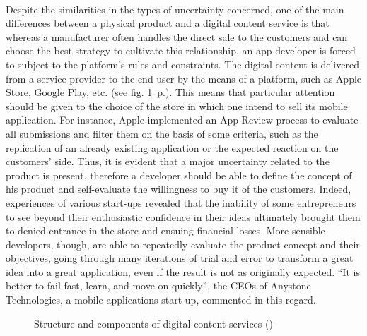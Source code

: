 \documentclass[twoside]{report}
\begin{document}
	\paragraph{}
	Despite the similarities in the types of uncertainty concerned, one of the main differences between a physical product and a digital content service is that whereas a manufacturer often handles the direct sale to the customers and can choose the best strategy to cultivate this relationship, an app developer is forced to subject to the platform's rules and constraints. The digital content is delivered from a service provider to the end user by the means of a platform, such as Apple Store, Google Play, etc. (see fig. \ref{fig:content_service}~p.\pageref{fig:content_service}). This means that particular attention should be given to the choice of the store in which one intend to sell its mobile application. For instance, Apple implemented an App Review process to evaluate all submissions and filter them on the basis of some criteria, such as the replication of an already existing application or the expected reaction on the customers' side. Thus, it is evident that a major uncertainty related to the product is present, therefore a developer should be able to define the concept of his product and self-evaluate the willingness to buy it of the customers. Indeed, experiences of various start-ups revealed that the inability of some entrepreneurs to see beyond their enthusiastic confidence in their ideas ultimately brought them to denied entrance in the store and ensuing financial losses. More sensible developers, though, are able to repeatedly evaluate the product concept and their objectives, going through many iterations of trial and error to transform a great idea into a great application, even if the result is not as originally expected. \enquote{It is better to fail fast, learn, and move on quickly}, the CEOs of Anystone Technologies, a mobile applications start-up, commented in this regard.
	\begin{figure}
		\begin{center}
			
			\caption{Structure and components of digital content services (\cite{kim_patterns_2012})}
			\label{fig:content_service}
		\end{center}
	\end{figure}
\end{document}
